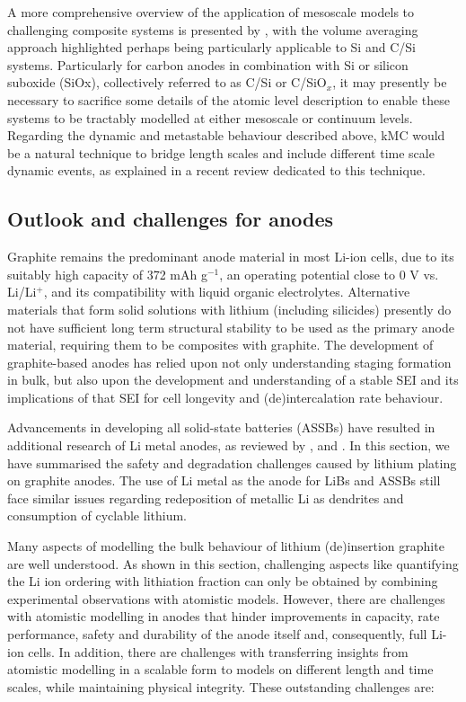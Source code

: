 \documentclass[../main.tex]{subfiles}
\begin{document}
A more comprehensive overview of the application of mesoscale models to challenging composite systems is presented by \citeauthor{franco2019}, with the volume averaging approach highlighted perhaps being particularly applicable to Si and C/Si systems.\cite{franco2019} Particularly for carbon anodes in combination with Si or silicon suboxide (SiOx), collectively referred to as C/Si or C/SiO$_x$, it may presently be necessary to sacrifice some details of the atomic level description to enable these systems to be tractably modelled at either mesoscale or continuum levels. Regarding the dynamic and metastable behaviour described above, kMC would be a natural technique to bridge length scales and include different time scale dynamic events, as explained in a recent review dedicated to this technique.\cite{Gavil_n_Arriazu_2021_kmc}

\subsection{Outlook and challenges for anodes}
\label{sec:anodes_outlook}
Graphite remains the predominant anode material in most Li-ion cells, due to its suitably high capacity of 372 mAh g$^{-1}$, an operating potential close to 0 V vs. Li/Li$^{+}$, and its compatibility with liquid organic electrolytes. Alternative materials that form solid solutions with lithium (including silicides) presently do not have sufficient long term structural stability to be used as the primary anode material, requiring them to be composites with graphite. The development of graphite-based anodes has relied upon not only understanding staging formation in bulk, but also upon the development and understanding of a stable SEI and its implications of that SEI for cell longevity and (de)intercalation rate behaviour.

Advancements in developing all solid-state batteries (ASSBs) have resulted in additional research of Li metal anodes, as reviewed by \citeauthor{fang2019key},\cite{fang2019key} and \citeauthor{li2018developing}.\cite{li2018developing} In this section, we have summarised the safety and degradation challenges caused by lithium plating on graphite anodes. The use of Li metal as the anode for LiBs and ASSBs still face similar issues regarding redeposition of metallic Li as dendrites and consumption of cyclable lithium.\cite{fang2019key,li2018developing}

Many aspects of modelling the bulk behaviour of lithium (de)insertion graphite are well understood. As shown in this section, challenging aspects like quantifying the Li ion ordering with lithiation fraction can only be obtained by combining experimental observations with atomistic models. However, there are challenges with atomistic modelling in anodes that hinder improvements in capacity, rate performance, safety and durability of the anode itself and, consequently, full Li-ion cells. In addition, there are challenges with transferring insights from atomistic modelling in a scalable form to models on different length and time scales, while maintaining physical integrity. These outstanding challenges are:
\end{document}
